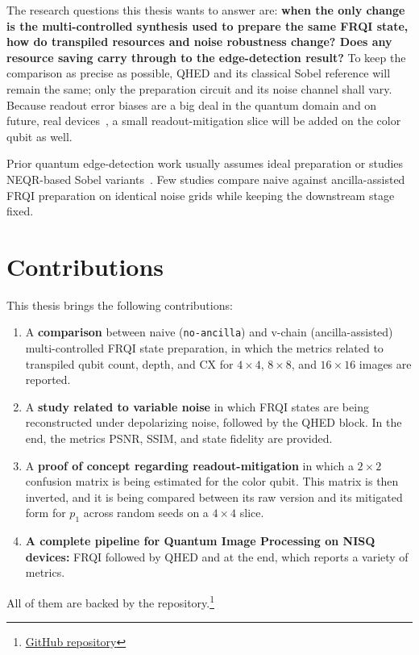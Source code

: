 The research questions this thesis wants to answer are: \textbf{when the only change is the multi-controlled synthesis used to prepare the same FRQI state, how do transpiled resources and noise robustness change? Does any resource saving carry through to the edge-detection result?} To keep the comparison as precise as possible, QHED and its classical Sobel reference will remain the same; only the preparation circuit and its noise channel shall vary. Because readout error biases are a big deal in the quantum domain and on  future, real devices~\cite{Mu2025GuidedImageFiltering}, a small readout-mitigation slice will be added on the color qubit as well.

Prior quantum edge-detection work usually assumes ideal preparation or studies NEQR-based Sobel variants~\cite{Zhang2013NEQR,Zhang2015QSobel,Fan2019SobelNEQR,Chetia2021ImprovedSobelNEQR}. Few studies compare naive against ancilla-assisted FRQI preparation on identical noise grids while keeping the downstream stage fixed.

\section{Contributions}
This thesis brings the following contributions:
\begin{enumerate}
  \item A \textbf{comparison} between naive (\texttt{no-ancilla}) and v-chain (ancilla-assisted) multi-controlled FRQI state preparation, in which the metrics related to transpiled qubit count, depth, and CX for $4\times 4$, $8\times 8$, and $16\times 16$ images are reported.
  \item A \textbf{study related to variable noise} in which FRQI states are being reconstructed under depolarizing noise, followed by the QHED block. In the end, the metrics PSNR, SSIM, and state fidelity are provided.
  \item A \textbf{proof of concept regarding readout-mitigation} in which a $2\times 2$ confusion matrix is being estimated for the color qubit. This matrix is then inverted, and it is being compared between its raw version and its mitigated form for $p_1$ across random seeds on a $4\times 4$ slice.
  \item \textbf{ A complete pipeline for Quantum Image Processing on NISQ devices:} FRQI followed by QHED and at the end, which reports a variety of metrics.
\end{enumerate}
All of them  are backed by the repository.\footnote{\href{https://github.com/AlexandruAlex10/qip-frqi-qhed-mcx-ancilla-and-calibration-matrix-inversion}{GitHub repository}}

